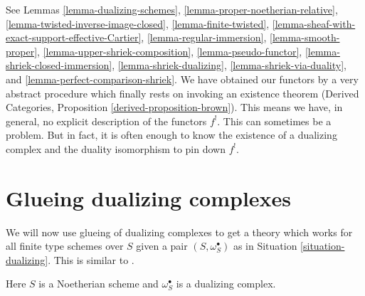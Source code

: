 See Lemmas
\ref{lemma-dualizing-schemes},
\ref{lemma-proper-noetherian-relative},
\ref{lemma-twisted-inverse-image-closed},
\ref{lemma-finite-twisted},
\ref{lemma-sheaf-with-exact-support-effective-Cartier},
\ref{lemma-regular-immersion},
\ref{lemma-smooth-proper},
\ref{lemma-upper-shriek-composition},
\ref{lemma-pseudo-functor},
\ref{lemma-shriek-closed-immersion},
\ref{lemma-shriek-dualizing},
\ref{lemma-shriek-via-duality}, and
\ref{lemma-perfect-comparison-shriek}.
We have obtained our functors by a very abstract procedure
which finally rests on invoking an existence theorem
(Derived Categories, Proposition \ref{derived-proposition-brown}).
This means we have, in general, no explicit description of the functors $f^!$.
This can sometimes be a problem. But in fact, it is often enough to know
the existence of a dualizing complex and the duality isomorphism
to pin down $f^!$.






\section{Glueing dualizing complexes}
\label{section-glue}

\noindent
We will now use glueing of dualizing complexes to get a theory which works for
all finite type schemes over $S$ given a pair $(S, \omega_S^\bullet)$
as in Situation \ref{situation-dualizing}. This is similar to
\cite[Remark on page 310]{RD}.

\begin{situation}
\label{situation-dualizing}
Here $S$ is a Noetherian scheme and $\omega_S^\bullet$ is a dualizing
complex.
\end{situation}

